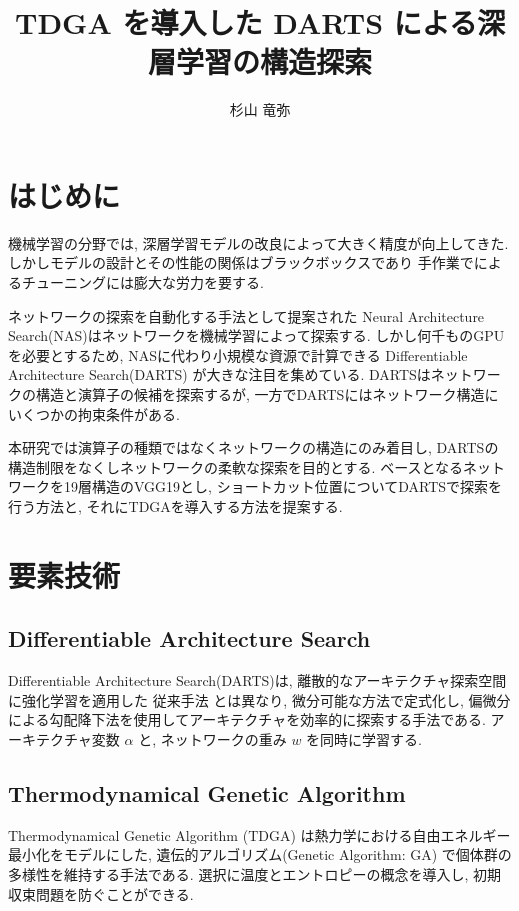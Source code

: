 \documentclass[a4paper,twoside,twocolumn,10pt]{article}
\title{TDGA を導入した DARTS による深層学習の構造探索}
\author{杉山 竜弥}
\begin{document}
\maketitle %
\small

\section{はじめに}
機械学習の分野では, 深層学習モデルの改良によって大きく精度が向上してきた.
しかしモデルの設計とその性能の関係はブラックボックスであり
手作業でによるチューニングには膨大な労力を要する.

ネットワークの探索を自動化する手法として提案された
Neural Architecture Search(NAS)はネットワークを機械学習によって探索する.
しかし何千ものGPUを必要とするため, NASに代わり小規模な資源で計算できる
Differentiable Architecture Search(DARTS) が大きな注目を集めている.
DARTSはネットワークの構造と演算子の候補を探索するが,
一方でDARTSにはネットワーク構造にいくつかの拘束条件がある.

本研究では演算子の種類ではなくネットワークの構造にのみ着目し,
DARTSの構造制限をなくしネットワークの柔軟な探索を目的とする.
ベースとなるネットワークを19層構造のVGG19とし,
ショートカット位置についてDARTSで探索を行う方法と, それにTDGAを導入する方法を提案する.


\section{要素技術}

\subsection{Differentiable Architecture Search}
Differentiable Architecture Search(DARTS)\cite{DBLP:journals/corr/abs-1806-09055}は,
離散的なアーキテクチャ探索空間に強化学習を適用した 従来手法 とは異なり,
微分可能な方法で定式化し,
偏微分による勾配降下法を使用してアーキテクチャを効率的に探索する手法である.
アーキテクチャ変数 $\alpha$ と, ネットワークの重み $w$ を同時に学習する.


\subsection{Thermodynamical Genetic Algorithm}
Thermodynamical Genetic Algorithm (TDGA) は熱力学における自由エネルギー最小化をモデルにした,
遺伝的アルゴリズム(Genetic Algorithm: GA) で個体群の多様性を維持する手法である.
選択に温度とエントロピーの概念を導入し, 初期収束問題を防ぐことができる.
\end{document}
